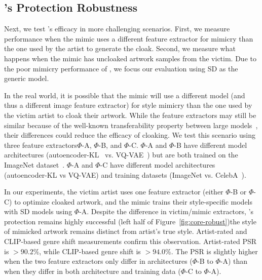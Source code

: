 \secspace
\subsection{\system{}'s Protection Robustness}
\label{sec:robust-eval}

\secspace

Next, we test \system{}'s efficacy in more challenging scenarios. First, we
measure performance when the mimic uses a different feature extractor for
mimicry than the one used by the artist to generate the cloak. Second, we
measure what happens when the mimic has uncloaked artwork samples from the
victim.  Due to the poor mimicry performance of \dalleM, we focus our
evaluation using SD as the generic model.

 In the real world, it
is possible that the mimic will use a different model (and thus a different image
feature extractor) for style mimicry than the one used by the victim artist
to cloak their artwork. While the feature extractors may still be similar
because of the well-known transferability property between large
models~\cite{demontis2019adversarial,transfer,suciu2018does,transfer2014,shan2022post},
their differences could reduce the efficacy of cloaking. We test this
scenario using three feature extractors\textemdash $\Phi$-A, $\Phi$-B, and
$\Phi$-C. $\Phi$-A and $\Phi$-B have different model architectures
(autoencoder-KL~\cite{rombach2022high} vs. VQ-VAE~\cite{ramesh2021zero}) but
are both trained on the ImageNet dataset~\cite{deng2009imagenet}. $\Phi$-A
and $\Phi$-C have different model architectures (autoencoder-KL vs VQ-VAE)
and training datasets (ImageNet vs. CelebA~\cite{liu2018large}).

In our experiments, the victim artist uses one feature extractor (either
$\Phi$-B or $\Phi$-C) to optimize cloaked artwork, and the mimic trains their
style-specific models with SD models using $\Phi$-A. Despite the difference
in victim/mimic extractors, \system{}'s protection remains highly successful
(left half of Figure~\ref{fig:core-robust})\textemdash the style of mimicked
artwork remains distinct from artist's true style. Artist-rated and
CLIP-based genre shift measurements confirm this observation. Artist-rated PSR is
$> 90.2\%$, while CLIP-based genre shift is $> 94.0\%$. The PSR is slightly higher
when the two feature extractors only differ in architectures ($\Phi$-B to
$\Phi$-A) than when they differ in both architecture and training data
($\Phi$-C to $\Phi$-A).


